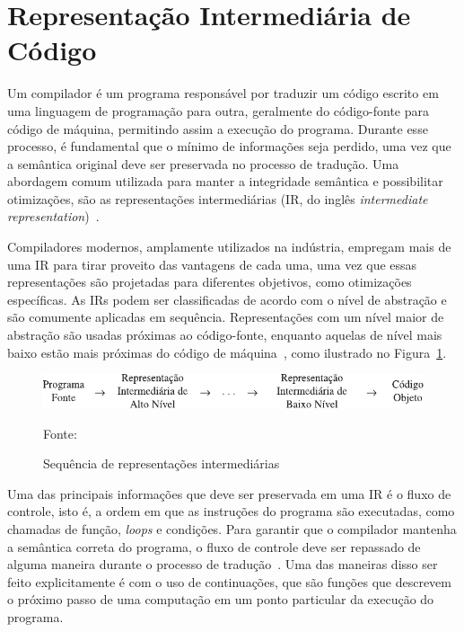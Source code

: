 \section{Representação Intermediária de Código}\label{sec:IR}

Um compilador é um programa responsável por traduzir um código escrito em uma linguagem de programação para outra, geralmente do código-fonte para código de máquina, permitindo assim a execução do programa.
Durante esse processo, é fundamental que o mínimo de informações seja perdido, uma vez que a semântica original deve ser preservada no processo de tradução.
Uma abordagem comum utilizada para manter a integridade semântica e possibilitar otimizações, são as representações intermediárias (IR, do inglês \textit{intermediate representation})~\cite{cooper2014construindo}.

Compiladores modernos, amplamente utilizados na indústria, empregam mais de uma IR para tirar proveito das vantagens de cada uma, uma vez que essas representações são projetadas para diferentes objetivos, como otimizações específicas.
As IRs podem ser classificadas de acordo com o nível de abstração e são comumente aplicadas em sequência.
Representações com um nível maior de abstração são usadas próximas ao código-fonte, enquanto aquelas de nível mais baixo estão mais próximas do código de máquina~\cite{aho2008compilers}, como ilustrado no Figura~\ref{fig:abstraction-level-irs}.

\begin{figure}[ht!]
  \centering
  \includegraphics[width=\textwidth]{Imagens/abstraction-level-irs.pdf}
  \caption{Sequência de representações intermediárias}\label{fig:abstraction-level-irs}
  \small{Fonte:~\cite{aho2008compilers}}
\end{figure}
Uma das principais informações que deve ser preservada em uma IR é o fluxo de controle, isto é, a ordem em que as instruções do programa são executadas, como chamadas de função, \textit{loops} e condições.
Para garantir que o compilador mantenha a semântica correta do programa, o fluxo de controle deve ser repassado de alguma maneira durante o processo de tradução~\cite{cooper2014construindo}.
Uma das maneiras disso ser feito explicitamente é com o uso de continuações, que são funções que descrevem o próximo passo de uma computação em um ponto particular da execução do programa.

